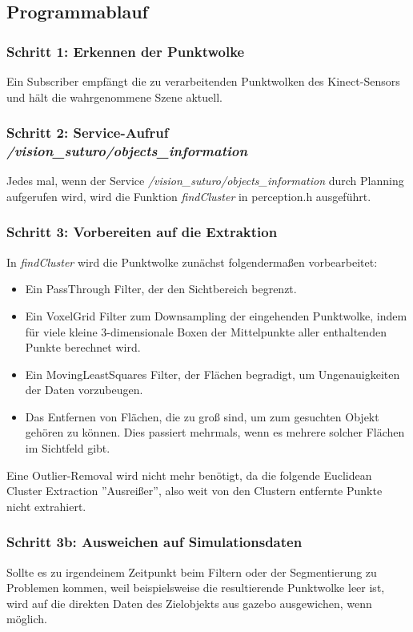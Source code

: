 \documentclass{suturo}
\begin{document}
\subsection{Programmablauf}
\subsubsection{Schritt 1: Erkennen der Punktwolke}
Ein Subscriber empfängt die zu verarbeitenden Punktwolken des Kinect-Sensors und hält die wahrgenommene Szene aktuell.
\subsubsection{Schritt 2: Service-Aufruf \textit{/vision\_suturo/objects\_information}}
Jedes mal, wenn der Service \textit{/vision\_suturo/objects\_information} durch Planning aufgerufen wird, wird die Funktion \textit{findCluster} in perception.h ausgeführt. 
\subsubsection{Schritt 3: Vorbereiten auf die Extraktion} 
In \textit{findCluster} wird die Punktwolke zunächst folgendermaßen vorbearbeitet:

\begin{itemize} 
\item Ein PassThrough Filter, der den Sichtbereich begrenzt.
\item Ein VoxelGrid Filter zum Downsampling der eingehenden Punktwolke, indem für viele kleine 3-dimensionale Boxen der Mittelpunkte aller enthaltenden Punkte berechnet wird.
\item Ein MovingLeastSquares Filter, der Flächen begradigt, um Ungenauigkeiten der Daten vorzubeugen.
\item Das Entfernen von Flächen, die zu groß sind, um zum gesuchten Objekt gehören zu können. Dies passiert mehrmals, wenn es mehrere solcher Flächen im Sichtfeld gibt.
\end{itemize}
Eine Outlier-Removal wird nicht mehr benötigt, da die folgende Euclidean Cluster Extraction ''Ausreißer'', also weit von den Clustern entfernte Punkte nicht extrahiert.\\
\subsubsection{Schritt 3b: Ausweichen auf Simulationsdaten}
Sollte es zu irgendeinem Zeitpunkt beim Filtern oder der Segmentierung zu Problemen kommen, weil beispielsweise die resultierende Punktwolke leer ist, wird auf die direkten Daten des Zielobjekts aus gazebo ausgewichen, wenn möglich.
\\
\end{document}
